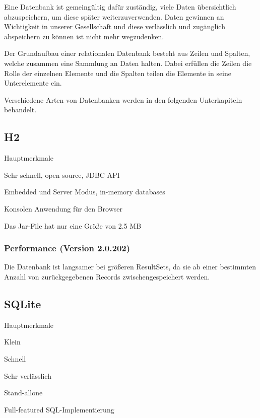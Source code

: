 
Eine Datenbank ist gemeingültig dafür zuständig, viele Daten übersichtlich abzuspeichern, um diese später weiterzuverwenden. Daten gewinnen an Wichtigkeit in unserer Gesellschaft und diese verlässlich und zugänglich abspeichern zu können ist nicht mehr wegzudenken.
 
Der Grundaufbau einer relationalen Datenbank besteht aus Zeilen und Spalten, welche zusammen eine Sammlung an Daten halten. Dabei erfüllen die Zeilen die Rolle der einzelnen Elemente und die Spalten teilen die Elemente in seine Unterelemente ein. \cite{javaInselBuch}
 
 Verschiedene Arten von Datenbanken werden in den folgenden Unterkapiteln behandelt.

\subsection{H2}
\begin{compactitem}
    \item[Hauptmerkmale]
    \item Sehr schnell, open source, JDBC API
    \item Embedded und Server Modus, in-memory databases        
    \item Konsolen Anwendung für den Browser
    \item Das Jar-File hat nur eine Größe von 2.5 MB
\end{compactitem} 
\cite{databaseComparison}


\subsubsection{Performance (Version 2.0.202)}
Die Datenbank ist langsamer bei größeren ResultSets, da sie ab einer bestimmten Anzahl von zurückgegebenen Records zwischengespeichert werden. \cite{databaseComparison}


 
\subsection{SQLite}

\begin{compactitem}
    \item [Hauptmerkmale]
    \item Klein
    \item Schnell        
    \item Sehr verlässlich
    \item Stand-allone
    \item Full-featured SQL-Implementierung
\end{compactitem} 
\cite{sqlliteOfficialSite}

